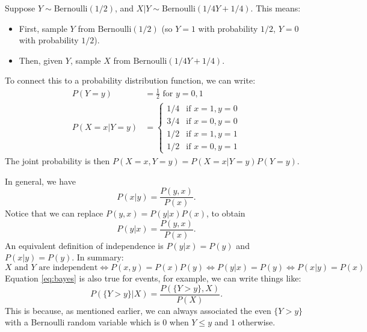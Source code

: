 \begin{example}
Suppose $Y \sim \text{Bernoulli}(1/2)$, and $X|Y \sim \text{Bernoulli}(1/4Y + 1/4)$. This means:
\begin{itemize}
  \item First, sample $Y$ from $\text{Bernoulli}(1/2)$ (so $Y=1$ with probability $1/2$, $Y=0$ with probability $1/2$).
  \item Then, given $Y$, sample $X$ from $\text{Bernoulli}(1/4Y + 1/4)$.
\end{itemize}
To connect this to a probability distribution function, we can write:
\begin{align*}
P(Y=y) &= \frac{1}{2} \text{ for } y=0,1 \\
P(X=x|Y=y) &= \begin{cases}
  1/4 & \text{if } x=1, y=0 \\
  3/4 & \text{if } x=0, y=0 \\
  1/2 & \text{if } x=1, y=1 \\
  1/2 & \text{if } x=0, y=1
\end{cases}
\end{align*}
The joint probability is then $P(X=x, Y=y) = P(X=x|Y=y)P(Y=y)$.
\end{example}

%


 In general, we have 
\begin{equation}
P(x|y) = \frac{P(y,x)}{P(x)}.
\end{equation}
Notice that we can replace $P(y,x) = P(y|x)P(x)$, to obtain 
\begin{equation}\label{eq:bayes}
P(y|x) = \frac{P(y,x)}{P(x)}.
\end{equation}
An equivalent definition of independence is $P(y|x)  = P(y)$ and $P(x|y) = P(y)$.  In summary: 
\begin{equation*}
\text{$X$ and $Y$ are independent} \iff P(x,y) = P(x)P(y) \iff P(y|x) = P(y) \iff P(x|y) = P(x)
\end{equation*}
Equation \eqref{eq:bayes} is also true for events, for example, we can write things like: 
\begin{equation}\label{eq:bayes}
P(\{Y>y\}|X) = \frac{P(\{Y>y\},X)}{P(X)}.
\end{equation}
This is because, as mentioned earlier, we can always associated the even $\{Y>y\}$ with a Bernoulli random variable which is $0$ when $Y \le y$ and $1$ otherwise. 




